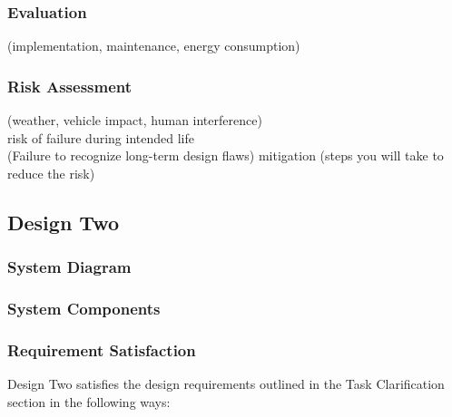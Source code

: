 \subsubsection{Evaluation}
(implementation, maintenance, energy consumption) \\

\subsubsection{Risk Assessment}
(weather, vehicle impact, human interference) \\
risk of failure during intended life \\
(Failure to recognize long-term design flaws)
mitigation (steps you will take to reduce the risk) \\

\newpage
\subsection{Design Two}
\subsubsection{System Diagram}
\subsubsection{System Components}
\subsubsection{Requirement Satisfaction}
Design Two satisfies the design requirements outlined in the Task Clarification section in the following ways:

